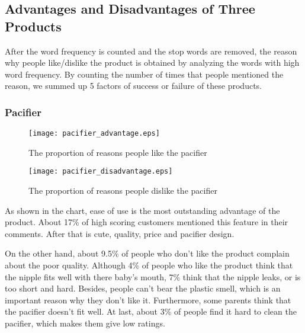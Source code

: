 \documentclass{mcmthesis}
\begin{document}
	
	\subsection{Advantages and Disadvantages of Three Products}
	After the word frequency is counted and the stop words are removed, the reason why people like/dislike the product is obtained by analyzing the words with high word frequency.
	By counting the number of times that people mentioned the reason, we summed up 5 factors of success or failure of these products.
	\subsubsection{Pacifier}
	\begin{figure}[H]
		\begin{minipage}[t]{0.5\textwidth}
			\centering
			\texttt{[image: pacifier\_advantage.eps]}
			\caption{The proportion of reasons people like the pacifier\label{fig:1}}
		\end{minipage}
		\qquad
		\begin{minipage}[t]{0.5\textwidth}
			\centering
			\texttt{[image: pacifier\_disadvantage.eps]}
			\caption{The proportion of reasons people dislike the pacifier\label{fig:2}}
		\end{minipage}
	\end{figure}
	\begin{flushleft}
		As shown in the chart, ease of use is the most outstanding advantage of the product. About 17\% of high scoring customers mentioned this feature in their comments. After that is cute, quality, price and pacifier design.
		
	\end{flushleft}
	\begin{flushleft}
		On the other hand, about 9.5\% of people who don't like the product complain
		about the poor quality. Although 4\% of people who like the product think that the nipple fits well with there baby's mouth, 7\%  think that the nipple leaks, or is too short and hard. Besides, people can't bear the plastic smell, which is an important reason why they don't like it. Furthermore, some parents think that the pacifier doesn't fit well. At last, about 3\% of people find it hard to clean the pacifier, which makes them give low ratings.
	\end{flushleft}
	
	
\end{document}
